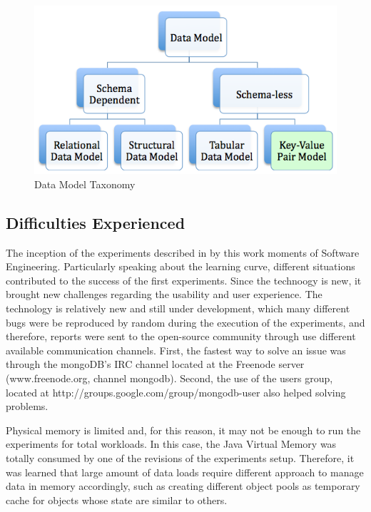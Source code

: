 \begin{figure}[!h]
  \centering
  \includegraphics[scale=0.5]{../diagrams/taxonomy-data-model-modified}
  \caption{Data Model Taxonomy}
  \label{fig:taxonomy-data-model-modified}
\end{figure}

\subsection{Difficulties Experienced}
\label{sec:experiments-difficulties}

The inception of the experiments described in by this work moments of Software
Engineering. Particularly speaking about the learning curve, different
situations contributed to the success of the first experiments. Since the
technoogy is new, it brought new challenges regarding the usability and user
experience. The technology is relatively new and still under development,
which many different bugs were be reproduced by random during the execution of
the experiments, and therefore, reports were sent to the open-source community
through use different available communication channels. First, the fastest way
to solve an issue was through the mongoDB's IRC channel located at the Freenode
server (www.freenode.org, channel mongodb). Second, the use of the users
group, located at http://groups.google.com/group/mongodb-user also helped
solving problems.

Physical memory is limited and, for this reason, it may not be enough to run
the experiments for total workloads. In this case, the Java Virtual Memory was
totally consumed by one of the revisions of the experiments setup. Therefore, 
it was learned that large amount of data loads require different approach to
manage data in memory accordingly, such as creating different object pools as
temporary cache for objects whose state are similar to others.

